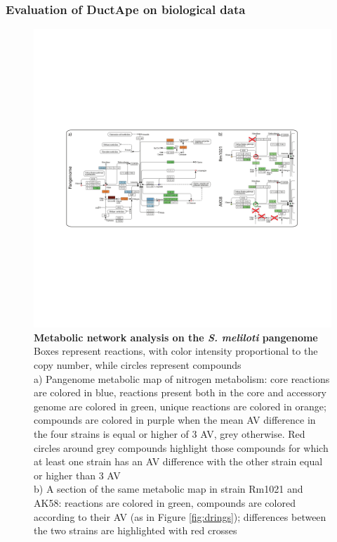 \subsubsection{Evaluation of DuctApe on biological data}
\begin{figure}
	\center
    \includegraphics[width=1\textwidth]{figures/2/thesis_24}
	\caption{\label{fig:dkeggmaps}\textbf{Metabolic network analysis on the \textit{S. meliloti} pangenome}\\
			Boxes represent reactions, with color intensity proportional to the copy number, while circles represent compounds\\
			a) Pangenome metabolic map of nitrogen metabolism: core reactions are colored in blue, reactions present both in the core and accessory genome are colored in green, unique reactions are colored in orange; compounds are colored in purple when the mean AV difference in the four strains is equal or higher of 3 AV, grey otherwise. Red circles around grey compounds highlight those compounds for which at least one strain has an AV difference with the other strain equal or higher than 3 AV\\
			b) A section of the same metabolic map in strain Rm1021 and AK58: reactions are colored in green, compounds are colored according to their AV (as in Figure \ref{fig:drings}); differences between the two strains are highlighted with red crosses}
\end{figure}


